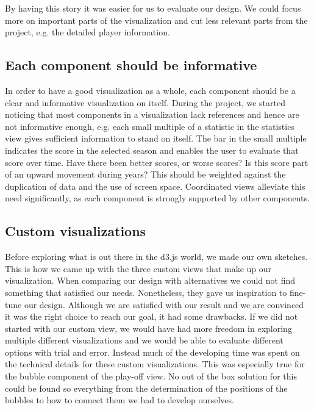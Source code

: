 \documentclass[]{sigchi}
\begin{document}
By having this story it was easier for us to evaluate our design. We could focus more on important parts of the visualization and cut less relevant parts from the project, e.g. the detailed player information.


\subsection{Each component should be informative}
In order to have a good visualization as a whole, each component should be a
clear and informative visualization on itself. During the project, we started noticing that most components in a visualization lack references and hence are not informative enough, e.g. each small multiple of a statistic in the statistics view gives sufficient information to stand on itself. The bar in the small multiple indicates the score in the selected season and enables the user to evaluate that score over time. Have there been better scores, or worse scores? Is this score
part of an upward movement during years? This should be weighted against the
duplication of data and the use of screen space. Coordinated views alleviate this
need significantly, as each component is strongly supported by other components.

\subsection{Custom visualizations}
Before exploring what is out there in the d3.js world, we made our own sketches.
This is how we came up with the three custom views that make up our visualization.
When comparing our design with alternatives we could not find something that
satisfied our needs. Nonetheless, they gave us inspiration to fine-tune our
design. Although we are satisfied with our result and we are convinced it was
the right choice to reach our goal, it had some drawbacks. If we did not started with our custom view, we would have had more freedom in exploring multiple different visualizations and we would be able to evaluate different options with trial and error. Instead much of the developing time was spent on the technical details for these custom visualizations. This was especially true for the bubble component of the play-off view. No out of the box solution for this could be found so everything from the determination of the positions of the bubbles to how to connect them we had to develop ourselves.
\end{document}
